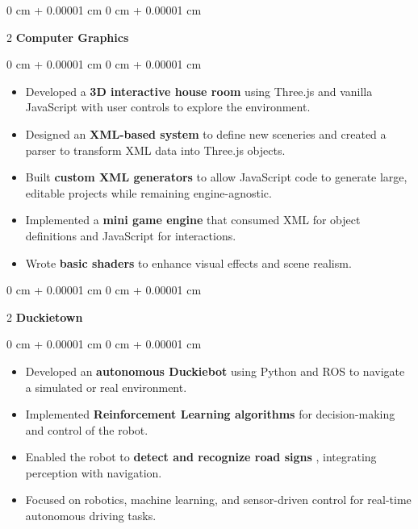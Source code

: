 \documentclass[10pt, letterpaper]{article}
\newenvironment{highlights}{
        \begin{itemize}[
            topsep=0.10 cm,
            parsep=0.10 cm,
            partopsep=0pt,
            itemsep=0pt,
            leftmargin=0 cm + 10pt
        ]
    }{
        \end{itemize}
    } %
\newenvironment{onecolentry}{
        \begin{adjustwidth}{
            0 cm + 0.00001 cm
        }{
            0 cm + 0.00001 cm
        }
    }{
        \end{adjustwidth}
    } %
\newenvironment{twocolentry}[2][]{
        \onecolentry
        \def\secondColumn{#2}
        \setcolumnwidth{\fill, 6.5cm}
        \begin{paracol}{2}
    }{
        \switchcolumn \raggedleft \secondColumn
        \end{paracol}
        \endonecolentry
    } %
\begin{document}
\vspace{0.2 cm}
\begin{twocolentry}{ }\textbf{Computer Graphics}\end{twocolentry}\vspace{0.10 cm}\begin{onecolentry}\begin{highlights}
\item Developed a  \textbf{3D interactive house room}  using Three.js and vanilla JavaScript with user controls to explore the environment.

\item Designed an  \textbf{XML-based system}  to define new sceneries and created a parser to transform XML data into Three.js objects.

\item Built  \textbf{custom XML generators}  to allow JavaScript code to generate large, editable projects while remaining engine-agnostic.

\item Implemented a  \textbf{mini game engine}  that consumed XML for object definitions and JavaScript for interactions.

\item Wrote  \textbf{basic shaders}  to enhance visual effects and scene realism.

\end{highlights} \end{onecolentry}
\vspace{0.2 cm}
\begin{twocolentry}{ }\textbf{Duckietown}\end{twocolentry}\vspace{0.10 cm}\begin{onecolentry}\begin{highlights}
\item Developed an  \textbf{autonomous Duckiebot}  using Python and ROS to navigate a simulated or real environment.

\item Implemented  \textbf{Reinforcement Learning algorithms}  for decision-making and control of the robot.

\item Enabled the robot to  \textbf{detect and recognize road signs} , integrating perception with navigation.

\item Focused on robotics, machine learning, and sensor-driven control for real-time autonomous driving tasks.

\end{highlights} \end{onecolentry}
\end{document}

